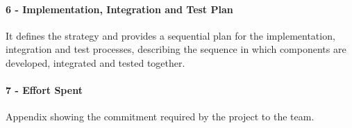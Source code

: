 	\paragraph*{6 - Implementation, Integration and Test Plan} 
	It defines the strategy and provides a sequential plan for the implementation, integration and test processes, describing the sequence in which components are developed, integrated and tested together.

	\paragraph*{7 - Effort Spent}
	Appendix showing the commitment required by the project to the team.

